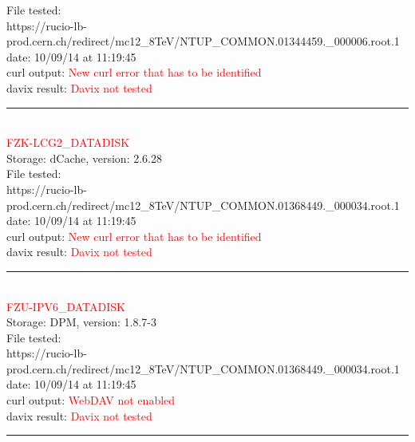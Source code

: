 File tested:\\
\footnotesize{https://rucio-lb-prod.cern.ch/redirect/mc12\_8TeV/NTUP\_COMMON.01344459.\_000006.root.1}\\

date: 10/09/14 at 11:19:45\\

curl output:  \textcolor{red}{New curl error that has to be identified}\\

davix result:  \textcolor{red}{Davix not tested}\\

\rule{\textwidth}{1pt}\\

\textcolor{red}{\normalsize{FZK-LCG2\_DATADISK}}\\

Storage: dCache, version: 2.6.28\\

File tested:\\
\footnotesize{https://rucio-lb-prod.cern.ch/redirect/mc12\_8TeV/NTUP\_COMMON.01368449.\_000034.root.1}\\

date: 10/09/14 at 11:19:45\\

curl output:  \textcolor{red}{New curl error that has to be identified}\\

davix result:  \textcolor{red}{Davix not tested}\\

\rule{\textwidth}{1pt}\\

\textcolor{red}{\normalsize{FZU-IPV6\_DATADISK}}\\

Storage: DPM, version: 1.8.7-3\\

File tested:\\
\footnotesize{https://rucio-lb-prod.cern.ch/redirect/mc12\_8TeV/NTUP\_COMMON.01368449.\_000034.root.1}\\

date: 10/09/14 at 11:19:45\\

curl output:  \textcolor{red}{WebDAV not enabled}\\

davix result:  \textcolor{red}{Davix not tested}\\

\rule{\textwidth}{1pt}\\


